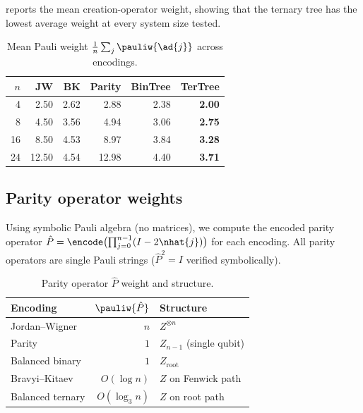  reports the mean creation-operator weight,
showing that the ternary tree has the lowest average weight at every
system size tested.

\begin{table}[t]
\centering
\caption{Mean Pauli weight $\frac{1}{n}\sum_j \pauliw{\ad{j}}$
  across encodings.}
\label{tab:mean-weight}
\begin{tabular}{@{}rrrrrr@{}}
\toprule
$n$ & JW & BK & Parity & BinTree & TerTree \\
\midrule
 4  & 2.50 & 2.62 & 2.88 & 2.38 & \textbf{2.00} \\
 8  & 4.50 & 3.56 & 4.94 & 3.06 & \textbf{2.75} \\
16  & 8.50 & 4.53 & 8.97 & 3.84 & \textbf{3.28} \\
24  & 12.50& 4.54 &12.98 & 4.40 & \textbf{3.71} \\
\bottomrule
\end{tabular}
\end{table}

\subsection{Parity operator weights}
\label{sec:val-parity}

Using symbolic Pauli algebra (no matrices), we compute the encoded
parity operator $\hat{P} = \encode\bigl(\prod_{j=0}^{n-1}
(I - 2\nhat{j})\bigr)$ for each encoding.  All parity operators are
single Pauli strings ($\hat{P}^2 = I$ verified symbolically).

\begin{table}[t]
\centering
\caption{Parity operator $\hat{P}$ weight and structure.}
\label{tab:parity}
\begin{tabular}{@{}lrl@{}}
\toprule
\textbf{Encoding} & $\pauliw{\hat{P}}$ & \textbf{Structure} \\
\midrule
Jordan--Wigner     & $n$            & $Z^{\otimes n}$ \\
Parity             & $1$            & $Z_{n-1}$ (single qubit) \\
Balanced binary    & $1$            & $Z_\text{root}$ \\
Bravyi--Kitaev     & $O(\log n)$    & $Z$ on Fenwick path \\
Balanced ternary   & $O(\log_3 n)$  & $Z$ on root path \\
\bottomrule
\end{tabular}
\end{table}

